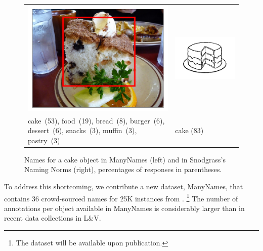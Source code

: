 \begin{figure}[tbp]
\scriptsize
\begin{tabular}{p{4.3cm}p{2cm}}
\centering
\includegraphics[scale=0.15]{figures/2390077_1254219_supercat_unique.png} &
\includegraphics[scale=0.4]{figures/snodgrass_vanderwart_cake_042.png}\\
 cake\ (53),  food\ (19), bread\ (8), burger\ (6), dessert\ (6), snacks\ (3), muffin\ (3),  pastry\ (3) & \hspace{.9cm} cake (83)
\end{tabular}
\caption{Names for a cake object in ManyNames (left) and in Snodgrass's Naming Norms (right), percentages of responses in parentheses.}
\label{fig:cake}
\end{figure}

To address this shortcoming, we contribute a new dataset, ManyNames, that contains 36 crowd-sourced names for 25K instances from \vgenome.%
\footnote{The dataset will be available upon publication.}
The number of annotations per object available in ManyNames is considerably larger than in recent data collections in L\&V.


